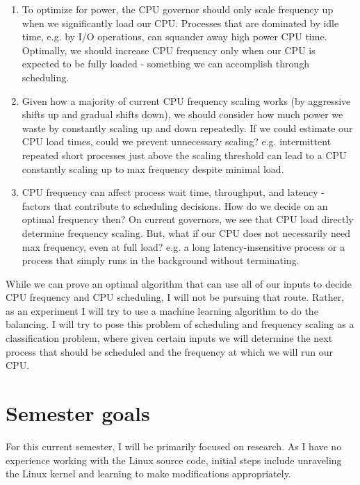\documentclass[12pt]{article}
\def\ind{\hspace*{0.3in}}
\begin{document}
\begin{enumerate}
    \item To optimize for power, the CPU governor should only scale frequency up when we significantly load our CPU. Processes that are dominated by idle time, e.g. by I/O operations, can squander away high power CPU time. Optimally, we should increase CPU frequency only when our CPU is expected to be fully loaded - something we can accomplish through scheduling.
    \item Given how a majority of current CPU frequency scaling works (by aggressive shifts up and gradual shifts down), we should consider how much power we waste by constantly scaling up and down repeatedly. If we could estimate our CPU load times, could we prevent unnecessary scaling? e.g. intermittent repeated short processes just above the scaling threshold can lead to a CPU constantly scaling up to max frequency despite minimal load.
    \item CPU frequency can affect process wait time, throughput, and latency - factors that contribute to scheduling decisions. How do we decide on an optimal frequency then? On current governors, we see that CPU load directly determine frequency scaling. But, what if our CPU does not necessarily need max frequency, even at full load? e.g. a long latency-insensitive process or a process that simply runs in the background without terminating.
\end{enumerate}

While we can prove an optimal algorithm that can use all of our inputs to decide CPU frequency and CPU scheduling, I will not be pursuing that route. Rather, as an experiment I will try to use a machine learning algorithm to do the balancing. I will try to pose this problem of scheduling and frequency scaling as a classification problem, where given certain inputs we will determine the next process that should be scheduled and the frequency at which we will run our CPU.


\section*{Semester goals}
\ind For this current semester, I will be primarily focused on research. As I have no experience working with the Linux source code, initial steps include unraveling the Linux kernel and learning to make modifications appropriately. 
\end{document}
